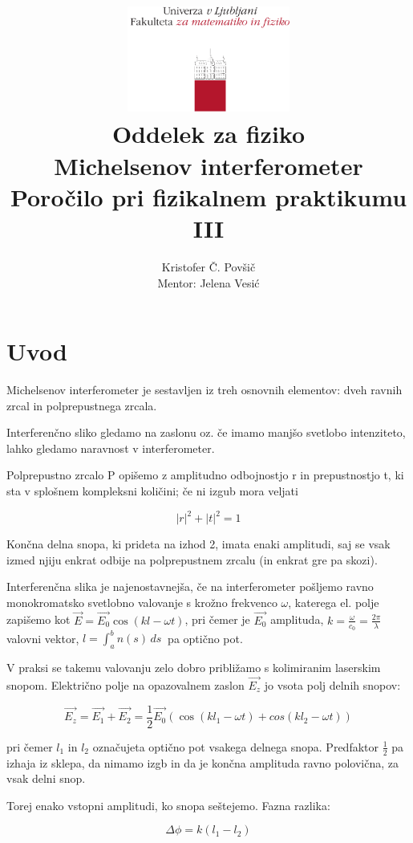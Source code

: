 \documentclass[12pt]{report}
\title{
  \includegraphics[width=0.4\textwidth]{fmf_logo}\\
  {\small Oddelek za fiziko} \\
  {Michelsenov interferometer}\\
  {\small Poročilo pri fizikalnem praktikumu III}\\

}
\date{}
\author{ Kristofer Č. Povšič \\[5 cm]
 \small  Mentor: Jelena Vesić\\
}
\begin{document}
\setcounter{page}{2}

\maketitle

\chapter*{Uvod}

Michelsenov interferometer je sestavljen iz treh osnovnih elementov: dveh ravnih zrcal in polprepustnega zrcala.

Interferenčno sliko gledamo na zaslonu oz. če imamo manjšo svetlobo intenziteto, lahko gledamo naravnost v interferometer. 

Polprepustno zrcalo P opišemo z amplitudno odbojnostjo r in prepustnostjo t, ki sta v splošnem kompleksni količini; če ni izgub mora veljati 

\begin{equation}
  |r|^2 + |t|^2 = 1
\end{equation}

Končna delna snopa, ki prideta na izhod 2, imata enaki amplitudi, saj se vsak izmed njiju enkrat odbije na polprepustnem zrcalu (in enkrat gre pa skozi). 

Interferenčna slika je najenostavnejša, če na interferometer pošljemo ravno monokromatsko svetlobno valovanje s krožno frekvenco $\omega$, katerega el. polje zapišemo kot $\vec{E} = \vec{E_0}\cos (kl - \omega t)$, pri čemer je $\vec{E_0}$ amplituda, $k = \frac{\omega}{c_0} = \frac{2 \pi}{\lambda}$ valovni vektor, $l = \int_{a}^{b} n(s) \,ds\ $ pa optično pot. 

V praksi se takemu valovanju zelo dobro približamo s kolimiranim laserskim snopom. Električno polje na opazovalnem zaslon $\vec{E_z}$ jo vsota polj delnih snopov: 

\begin{equation}
  \vec{E_z} = \vec{E_1} + \vec{E_2} = \frac{1}{2} \vec{E_0} (\cos (kl_1 - \omega t) + cos(kl_2 - \omega t))
\end{equation}

pri čemer $l_1$ in $l_2$ označujeta optično pot vsakega delnega snopa. Predfaktor $\frac{1}{2}$ pa izhaja iz sklepa, da nimamo izgb in da je končna amplituda ravno polovična, za vsak delni snop. 

Torej enako vstopni amplitudi, ko snopa seštejemo. Fazna razlika: 

\begin{equation}
  \Delta \phi = k(l_1 - l_2)
\end{equation}
\end{document}
